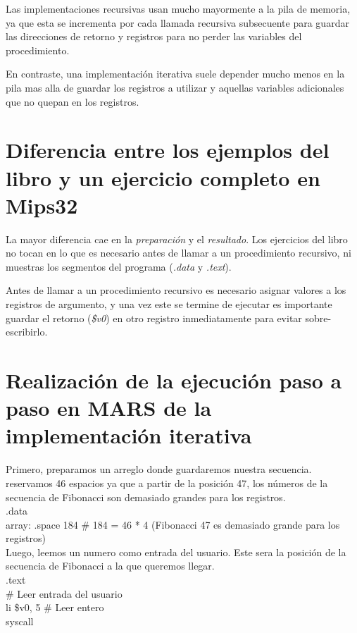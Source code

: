 \documentclass[titlepage]{article}
\begin{document}
Las implementaciones recursivas usan mucho mayormente a la pila de memoria, ya que esta se incrementa por cada llamada recursiva subsecuente para guardar las direcciones de retorno y registros para no perder las variables del procedimiento.

En contraste, una implementación iterativa suele depender mucho menos en la pila mas alla de guardar los registros a utilizar y aquellas variables adicionales que no quepan en los registros.

\section*{Diferencia entre los ejemplos del libro y un ejercicio completo en Mips32}

La mayor diferencia cae en la \emph{preparación} y el \emph{resultado}. Los ejercicios del libro no tocan en lo que es necesario antes de llamar a un procedimiento recursivo, ni muestras los segmentos del programa (\emph{.data} y \emph{.text}).

Antes de llamar a un procedimiento recursivo es necesario asignar valores a los registros de argumento, y una vez este se termine de ejecutar es importante guardar el retorno (\emph{\$v0}) en otro registro inmediatamente para evitar sobre-escribirlo.

\section*{Realización de la ejecución paso a paso en MARS de la implementación iterativa}

Primero, preparamos un arreglo donde guardaremos nuestra secuencia. reservamos 46 espacios ya que a partir de la posición 47, los números de la secuencia de Fibonacci son demasiado grandes para los registros.\\

\noindent .data\\
	array: .space 184 \# 184 = 46 * 4 (Fibonacci 47 es demasiado grande para los registros)\\

Luego, leemos un numero como entrada del usuario. Este sera la posición de la secuencia de Fibonacci a la que queremos llegar.\\

\noindent .text\\
	\# Leer entrada del usuario\\
	li \$v0, 5 \# Leer entero\\
	syscall\\
\end{document}
